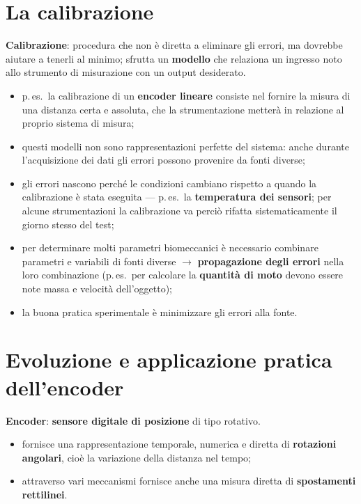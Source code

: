 \section{La calibrazione}

\textbf{Calibrazione}: procedura che non è diretta a eliminare gli errori, ma dovrebbe aiutare a
tenerli al minimo; sfrutta un \textbf{modello} che relaziona un ingresso noto allo strumento di
misurazione con un output desiderato.

\begin{itemize}
  \item p.\,es.\ la calibrazione di un \textbf{encoder lineare} consiste nel fornire la misura di
    una distanza certa e assoluta, che la strumentazione metterà in relazione al proprio sistema
    di misura;
  \item questi modelli non sono rappresentazioni perfette del sistema: anche durante l'acquisizione
    dei dati gli errori possono provenire da fonti diverse;
  \item gli errori nascono perché le condizioni cambiano rispetto a quando la calibrazione è stata
    eseguita --- p.\,es.\ la \textbf{temperatura dei sensori}; per alcune strumentazioni la
    calibrazione va perciò rifatta sistematicamente il giorno stesso del test;
  \item per determinare molti parametri biomeccanici è necessario combinare parametri e variabili
    di fonti diverse $\rightarrow$ \textbf{propagazione degli errori} nella loro combinazione
    (p.\,es.\ per calcolare la \textbf{quantità di moto} devono essere note massa e velocità
    dell'oggetto);
  \item la buona pratica sperimentale è minimizzare gli errori alla fonte.
\end{itemize}

\section{Evoluzione e applicazione pratica dell'encoder}

\textbf{Encoder}: \textbf{sensore digitale di posizione} di tipo rotativo.

\begin{itemize}
  \item fornisce una rappresentazione temporale, numerica e diretta di \textbf{rotazioni
    angolari}, cioè la variazione della distanza nel tempo;
  \item attraverso vari meccanismi fornisce anche una misura diretta di \textbf{spostamenti
    rettilinei}.
\end{itemize}

